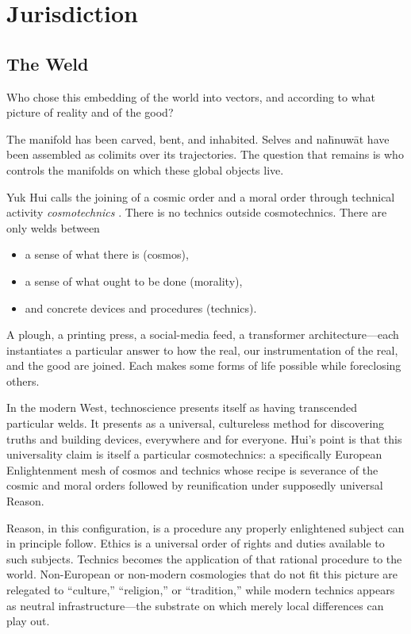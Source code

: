 \chapter{Jurisdiction}

\section{The Weld}

Who chose this embedding of the world into vectors, and according to what picture of reality and of the good?

The manifold has been carved, bent, and inhabited. Selves and na\={h}nuw\={a}t have been assembled as colimits over its trajectories. The question that remains is who controls the manifolds on which these global objects live.

Yuk Hui calls the joining of a cosmic order and a moral order through technical activity \emph{cosmotechnics} \cite{Hui2016}. There is no technics outside cosmotechnics. There are only welds between

\begin{itemize}
  \item a sense of what there is (cosmos),
  \item a sense of what ought to be done (morality),
  \item and concrete devices and procedures (technics).
\end{itemize}

A plough, a printing press, a social-media feed, a transformer architecture---each instantiates a particular answer to how the real, our instrumentation of the real, and the good are joined. Each makes some forms of life possible while foreclosing others.

In the modern West, technoscience presents itself as having transcended particular welds. It presents as a universal, cultureless method for discovering truths and building devices, everywhere and for everyone. Hui's point is that this universality claim is itself a particular cosmotechnics: a specifically European Enlightenment mesh of cosmos and technics whose recipe is severance of the cosmic and moral orders followed by reunification under supposedly universal Reason.

Reason, in this configuration, is a procedure any properly enlightened subject can in principle follow. Ethics is a universal order of rights and duties available to such subjects. Technics becomes the application of that rational procedure to the world. Non-European or non-modern cosmologies that do not fit this picture are relegated to ``culture,'' ``religion,'' or ``tradition,'' while modern technics appears as neutral infrastructure---the substrate on which merely local differences can play out.

